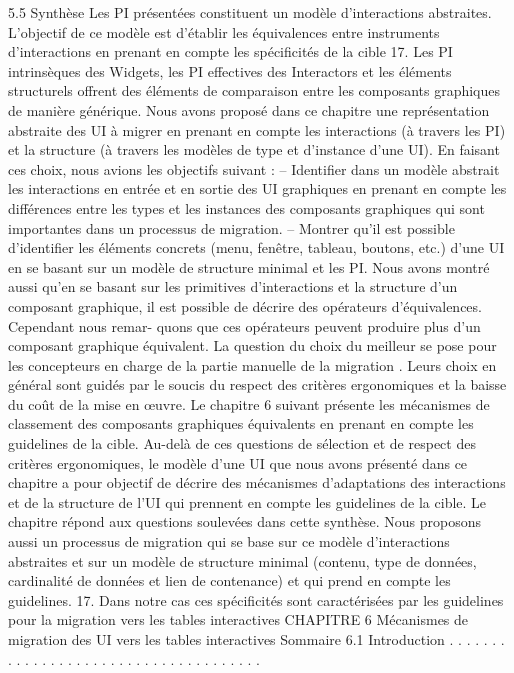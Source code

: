 \documentclass{article}
\begin{document}
5.5
Synthèse
Les PI présentées constituent un modèle d’interactions abstraites. L’objectif de ce modèle est
d’établir les équivalences entre instruments d’interactions en prenant en compte les spéciﬁcités de la
cible 17. Les PI intrinsèques des Widgets, les PI effectives des Interactors et les éléments structurels
offrent des éléments de comparaison entre les composants graphiques de manière générique.
Nous avons proposé dans ce chapitre une représentation abstraite des UI à migrer en prenant en
compte les interactions (à travers les PI) et la structure (à travers les modèles de type et d’instance
d’une UI). En faisant ces choix, nous avions les objectifs suivant :
– Identiﬁer dans un modèle abstrait les interactions en entrée et en sortie des UI graphiques en
prenant en compte les différences entre les types et les instances des composants graphiques
qui sont importantes dans un processus de migration.
– Montrer qu’il est possible d’identiﬁer les éléments concrets (menu, fenêtre, tableau, boutons,
etc.) d’une UI en se basant sur un modèle de structure minimal et les PI.
Nous avons montré aussi qu’en se basant sur les primitives d’interactions et la structure d’un
composant graphique, il est possible de décrire des opérateurs d’équivalences. Cependant nous remar-
quons que ces opérateurs peuvent produire plus d’un composant graphique équivalent. La question du
choix du meilleur se pose pour les concepteurs en charge de la partie manuelle de la migration . Leurs
choix en général sont guidés par le soucis du respect des critères ergonomiques et la baisse du coût
de la mise en œuvre. Le chapitre 6 suivant présente les mécanismes de classement des composants
graphiques équivalents en prenant en compte les guidelines de la cible.
Au-delà de ces questions de sélection et de respect des critères ergonomiques, le modèle d’une UI
que nous avons présenté dans ce chapitre a pour objectif de décrire des mécanismes d’adaptations des
interactions et de la structure de l’UI qui prennent en compte les guidelines de la cible. Le chapitre
répond aux questions soulevées dans cette synthèse. Nous proposons aussi un processus de migration
qui se base sur ce modèle d’interactions abstraites et sur un modèle de structure minimal (contenu,
type de données, cardinalité de données et lien de contenance) et qui prend en compte les guidelines.
17. Dans notre cas ces spéciﬁcités sont caractérisées par les guidelines pour la migration vers les tables interactives
CHAPITRE 6
Mécanismes de migration des UI vers les
tables interactives
Sommaire
6.1
Introduction . . . . . . . . . . . . . . . . . . . . . . . . . . . . . . . . . . . . .
\end{document}
